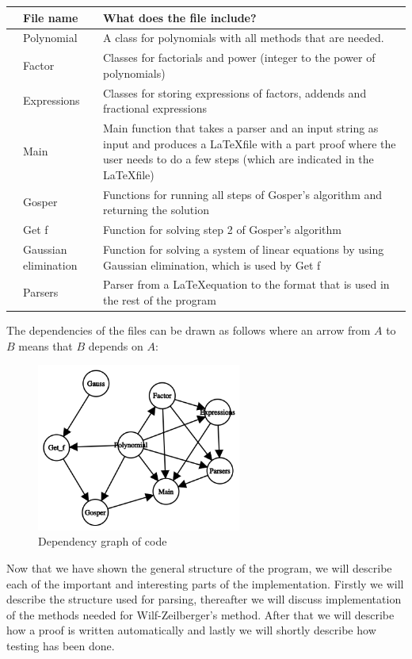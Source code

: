 \begin{center}
  \begin{tabular}{C{1mm}C{3cm}|C{8cm}}
    &\textbf{File name}   & \textbf{What does the file include?} \\ \hline
    &Polynomial  & A class for polynomials with all methods that are needed. \\ \hline
    &Factor      & Classes for factorials and power (integer to the power of polynomials) \\ \hline
    &Expressions & Classes for storing expressions of factors, addends and fractional expressions \\ \hline
    &Main        & Main function that takes a parser and an input string as input and produces a \LaTeX file with a part proof where the user needs to do a few steps (which are indicated in the \LaTeX file) \\ \hline
    &Gosper      & Functions for running all steps of Gosper's algorithm and returning the solution \\ \hline
    &Get f       & Function for solving step 2 of Gosper's algorithm \\ \hline
    &Gaussian elimination & Function for solving a system of linear equations by using Gaussian elimination, which is used by Get f \\ \hline
    &Parsers     & Parser from a \LaTeX equation to the format that is used in the rest of the program \\
  \end{tabular}
\end{center}

The dependencies of the files can be drawn as follows where an arrow from $A$ to $B$ means that $B$ depends on $A$:
\begin{figure}[H]
\centering
\includegraphics[width=0.6\textwidth]{images/dependency_graph.png}
\caption{Dependency graph of code}\label{Fig: DepGraph}
\end{figure}
Now that we have shown the general structure of the program, we will describe each of the important and interesting parts of the implementation. Firstly we will describe the structure used for parsing, thereafter we will discuss implementation of the methods needed for Wilf-Zeilberger's method. After that we will describe how a proof is written automatically and lastly we will shortly describe how testing has been done.

